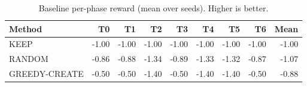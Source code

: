 \begin{table}[t]\centering\small
\caption{Baseline per-phase reward (mean over seeds). Higher is better.}
\label{tab:baselines}
\begin{tabular}{lrrrrrrrr}
\toprule
Method & T0 & T1 & T2 & T3 & T4 & T5 & T6 & Mean \\
\midrule
KEEP & -1.00 & -1.00 & -1.00 & -1.00 & -1.00 & -1.00 & -1.00 & -1.00 \\
RANDOM & -0.86 & -0.88 & -1.34 & -0.89 & -1.33 & -1.32 & -0.87 & -1.07 \\
GREEDY-CREATE & -0.50 & -0.50 & -1.40 & -0.50 & -1.40 & -1.40 & -0.50 & -0.88 \\
\bottomrule\end{tabular}\end{table}